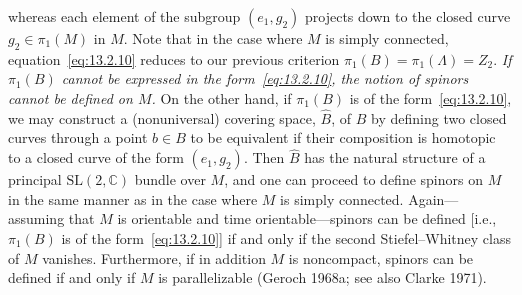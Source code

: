 whereas each element of the subgroup \((e_1,g_2)\) projects down to the closed curve
\(g_2\in\pi_1(M)\) in \(M\). Note that in the case where \(M\) is simply connected,
equation~\eqref{eq:13.2.10} reduces to our previous criterion
\(\pi_1(B)=\pi_1(\Lambda)=Z_2\). \emph{If \(\pi_1(B)\) cannot be expressed in the
form~\eqref{eq:13.2.10}, the notion of spinors cannot be defined on \(M\).} On the
other hand, if \(\pi_1(B)\) is of the form~\eqref{eq:13.2.10}, we may construct a
(nonuniversal) covering space, \(\widehat B\), of \(B\) by defining two closed
curves through a point \(b\in B\) to be equivalent if their composition is homotopic
to a closed curve of the form \((e_1,g_2)\). Then \(\widehat B\) has the natural
structure of a principal \(\mathrm{SL}(2,\mathbb C)\) bundle over \(M\), and one can
proceed to define spinors on \(M\) in the same manner as in the case where \(M\) is
simply connected. Again---assuming that \(M\) is orientable and time
orientable---spinors can be defined [i.e., \(\pi_1(B)\) is of the
form~\eqref{eq:13.2.10}] if and only if the second Stiefel--Whitney class of \(M\)
vanishes. Furthermore, if in addition \(M\) is noncompact, spinors can be defined if
and only if \(M\) is parallelizable (Geroch 1968a; see also Clarke 1971).

